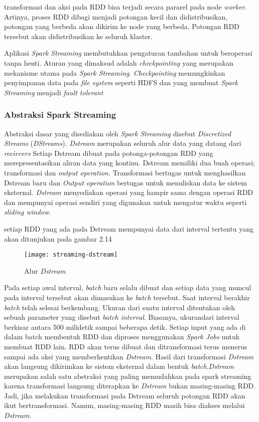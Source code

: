 transformasi dan aksi pada RDD bisa terjadi secara pararel pada node \textit{worker}. Artinya, proses RDD dibagi menjadi potongan kecil dan didistribusikan, potongan yang berbeda akan dikirim ke node yang berbeda. Potongan RDD tersebut akan didistribusikan ke seluruh klaster.

Aplikasi \textit{Spark Streaming} membutuhkan pengaturan tambahan untuk beroperasi tanpa henti. Aturan yang dimaksud adalah \textit{checkpointing} yang merupakan mekanisme utama pada \textit{Spark Streaming}. \textit{Checkpointing} memungkinkan penyimpanan data pada \textit{file system} seperti HDFS dan yang membuat \textit{Spark Streaming} menjadi \textit{fault tolerant}

\subsubsection{Abstraksi Spark Streaming}

Abstraksi dasar yang disediakan oleh \textit{Spark Streaming} disebut \textit{Discretized Streams} (\textit{DStreams}). \textit{Dstream} merupakan seluruh alur data yang datang dari \textit{recievers} Setiap Dstream dibuat pada potonga-potongan RDD yang merepresentasikan aliran data yang kontinu. Dstream memiliki dua buah operasi; transformasi dan \textit{output operation}. Transformasi bertugas untuk menghasilkan Dstream baru dan \textit{Output operation} bertugas untuk menuliskan data ke sistem eksternal. \textit{Dstream} menyediakan operasi yang hampir sama dengan operasi RDD dan mempunyai operasi sendiri yang digunakan untuk mengatur waktu seperti \textit{sliding window}.
 
setiap RDD yang ada pada Dstream mempunyai data dari interval tertentu yang akan ditunjukan pada gambar 2.14

\begin{figure}[H] 
	\centering  
	\texttt{[image: streaming-dstream]}  
	\caption[Gambar Alur {\it Dstream}]{Alur {\it Dstream}} 
	\label{fig:processing-events relationship} 
	\end{figure}

Pada setiap awal interval, \textit{batch} baru selalu dibuat dan setiap data yang muncul pada interval tersebut akan dimasukan ke \textit{batch} tersebut. Saat interval berakhir \textit{batch} telah selesai berkembang. Ukuran dari suatu interval ditentukan oleh sebuah parameter yang disebut \textit{batch interval}. Biasanya, ukurandari interval berkisar antara 500 milidetik sampai beberapa detik. Setiap input yang ada di dalam batch membentuk RDD dan diproses menggunakan \textit{Spark Jobs} untuk membuat RDD lain. RDD akan terus dibuat dan ditransformasi terus menerus sampai ada aksi yang memberhentikan \textit{Dstream}. Hasil dari transformasi \textit{Dstream} akan langsung dikirimkan ke sistem eksternal dalam bentuk \textit{batch}.\newline \textit{Dstream} merupakan salah satu abstraksi yang paling memudahkan pada spark streaming karena transformasi langsung diterapkan ke \textit{Dstream} bukan masing-masing RDD. Jadi, jika melakukan transformasi pada Dstream seluruh potongan RDD akan ikut bertransformasi. Namun, masing-masing RDD masih bisa diakses melalui \textit{Dstream}.

